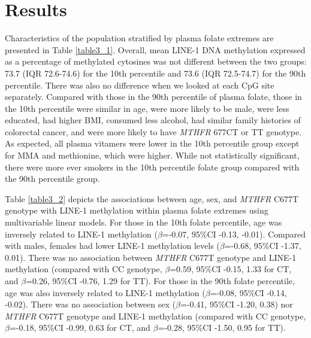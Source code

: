 \section{Results} %
\noindent Characteristics of the population stratified by plasma folate extremes are presented in Table \ref{table3_1}. Overall, mean LINE-1 DNA methylation expressed as a percentage of methylated cytosines was not different between the two groups: 73.7 (IQR 72.6-74.6) for the 10th percentile and 73.6 (IQR 72.5-74.7) for the 90th percentile. There was also no difference when we looked at each CpG site separately. Compared with those in the 90th percentile of plasma folate, those in the 10th percentile were similar in age, were more likely to be male, were less educated, had higher BMI, consumed less alcohol, had similar family histories of colorectal cancer, and were more likely to have \emph{MTHFR} 677CT or TT genotype. As expected, all plasma vitamers were lower in the 10th percentile group except for MMA and methionine, which were higher. While not statistically significant, there were more ever smokers in the 10th percentile folate group compared with the 90th percentile group.

\noindent Table \ref{table3_2} depicts the associations between age, sex, and \emph{MTHFR} C677T genotype with LINE-1 methylation within plasma folate extremes using multivariable linear models. For those in the 10th folate percentile, age was inversely related to LINE-1 methylation ($\beta$=-0.07, 95\%CI -0.13, -0.01). Compared with males, females had lower LINE-1 methylation levels ($\beta$=-0.68, 95\%CI -1.37, 0.01). There was no association between \emph{MTHFR} C677T genotype and LINE-1 methylation (compared with CC genotype, $\beta$=0.59, 95\%CI -0.15, 1.33 for CT, and $\beta$=0.26, 95\%CI -0.76, 1.29 for TT). For those in the 90th folate percentile, age was also inversely related to LINE-1 methylation ($\beta$=-0.08, 95\%CI -0.14, -0.02). There was no association between sex ($\beta$=-0.41, 95\%CI -1.20, 0.38) nor \emph{MTHFR} C677T genotype and LINE-1 methylation (compared with CC genotype, $\beta$=-0.18, 95\%CI -0.99, 0.63 for CT, and $\beta$=-0.28, 95\%CI -1.50, 0.95 for TT). 


